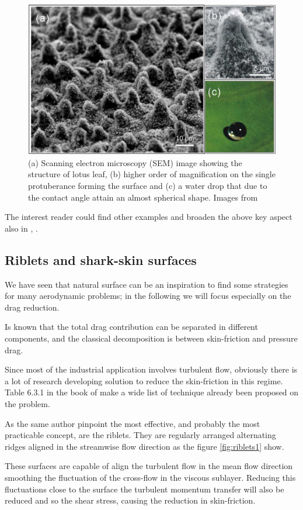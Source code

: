 \begin{figure}[h]
	\centering
	\includegraphics[width=0.6\linewidth]{chapter_1/lotus}
	\caption{(a) Scanning electron microscopy (SEM) image showing the structure of lotus leaf, (b) higher order of magnification on the single protuberance forming the surface and (c) a water drop that due to the contact angle attain an almost spherical shape. Images from \cite{stratakis2009laser}}
	\label{fig:lotus}
\end{figure}


The interest reader could find other examples and broaden the above key aspect also in \cite{bhushan2016biomimetics}, \cite{tropea2012nature}.



\subsection{Riblets and shark-skin surfaces}

We have seen that natural surface can be an inspiration to find some strategies for many aerodynamic problems; in the following we will focus especially on the drag reduction.

Is known that the total drag contribution can be separated in different components, and the classical decomposition is between skin-friction and pressure drag.

Since most of the industrial application involves turbulent flow, obviously there is a lot of research developing solution to reduce the skin-friction in this regime.
Table 6.3.1 in the book of \citet{mclean2012understanding} make a wide list of technique already been proposed on the problem.

As the same author pinpoint the most effective, and probably the most practicable concept, are the riblets.
They are regularly arranged alternating ridges aligned in the streamwise flow direction as the figure \ref{fig:riblets1} show.

These surfaces are capable of align the turbulent flow in the mean flow direction smoothing the fluctuation of the cross-flow in the viscous sublayer.
Reducing this fluctuations close to the surface the turbulent momentum transfer will also be reduced and so the shear stress, causing the reduction in skin-friction.

